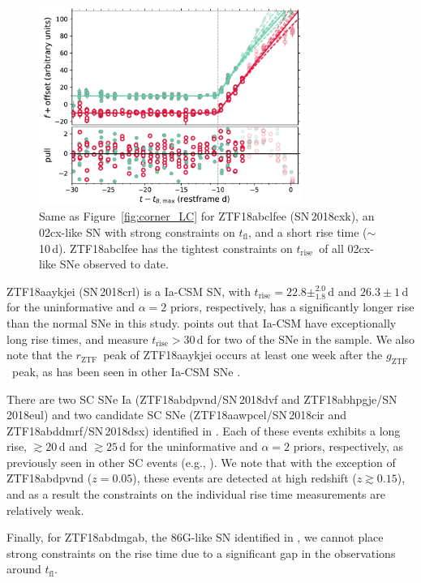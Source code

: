 \documentclass[twocolumn]{./aastex63}
\newcommand{\rztf}{$r_\mathrm{ZTF}$}
\newcommand{\gztf}{$g_\mathrm{ZTF}$}
\newcommand{\tfl}{$t_\mathrm{fl}$}
\newcommand{\trise}{$t_\mathrm{rise}$}
\begin{document}
\begin{figure}
    \centering
    \includegraphics[width=3.4in]{./figures/ZTF18abclfee_model_lc.pdf}
    \caption{Same as Figure~\ref{fig:corner_LC} for ZTF18abclfee (SN\,2018cxk),
    an 02cx-like SN with strong constraints on \tfl, and a short rise time
    ($\sim$10\,d). ZTF18abclfee has the tightest constraints on \trise\ of all
    02cx-like SNe observed to date.}
    \label{fig:02cx}
\end{figure}

ZTF18aaykjei (SN\,2018crl) is a Ia-CSM SN, with \trise$ = 22.8
\pm^{2.0}_{1.8}$\,d and $26.3 \pm 1$\,d for the uninformative and $\alpha = 2$
priors, respectively, has a significantly longer rise than the normal SNe in
this study. \citet{Silverman13} points out that Ia-CSM have exceptionally long
rise times, and \citet{Firth15} measure \trise$ > 30$\,d for two of the SNe in
the \citet{Silverman13} sample. We also note that the \rztf\ peak of
ZTF18aaykjei occurs at least one week after the \gztf\ peak, as has been seen
in other Ia-CSM SNe \citep{aldering05gj,prieto05gj}.

There are two SC SNe Ia (ZTF18abdpvnd/SN\,2018dvf and
ZTF18abhpgje/SN\,2018eul) and two candidate SC SNe (ZTF18aawpcel/SN\,2018cir
and ZTF18abddmrf/SN\,2018dsx) identified in \citet{Yao19}. Each of these
events exhibits a long rise, $\gtrsim 20$\,d and $\gtrsim 25$\,d for the
uninformative and $\alpha=2$ priors, respectively, as previously seen in other
SC events (e.g., \citealt{Scalzo10,Silverman11}). We note that with the
exception of ZTF18abdpvnd ($z = 0.05$), these events are detected at high
redshift ($z \gtrsim 0.15$), and as a result the constraints on the individual
rise time measurements are relatively weak.

Finally, for ZTF18abdmgab, the 86G-like SN identified in \citet{Yao19}, we
cannot place strong constraints on the rise time due to a significant gap in
the observations around \tfl.
\end{document}
